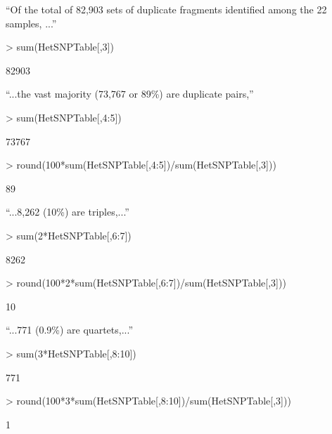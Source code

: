 \documentclass{article}
\begin{document}
``Of the total of 82,903 sets of duplicate fragments identified among the 22 samples, ...''


\begin{Schunk}
\begin{Sinput}
> sum(HetSNPTable[,3])
\end{Sinput}
\begin{Soutput}
[1] 82903
\end{Soutput}
\end{Schunk}

``...the vast majority (73,767 or 89\%) are duplicate pairs,''

\begin{Schunk}
\begin{Sinput}
> sum(HetSNPTable[,4:5])
\end{Sinput}
\begin{Soutput}
[1] 73767
\end{Soutput}
\begin{Sinput}
> round(100*sum(HetSNPTable[,4:5])/sum(HetSNPTable[,3]))
\end{Sinput}
\begin{Soutput}
[1] 89
\end{Soutput}
\end{Schunk}

``...8,262 (10\%) are triples,...''
\begin{Schunk}
\begin{Sinput}
> sum(2*HetSNPTable[,6:7])
\end{Sinput}
\begin{Soutput}
[1] 8262
\end{Soutput}
\begin{Sinput}
> round(100*2*sum(HetSNPTable[,6:7])/sum(HetSNPTable[,3]))
\end{Sinput}
\begin{Soutput}
[1] 10
\end{Soutput}
\end{Schunk}

``...771 (0.9\%) are quartets,...'' 
\begin{Schunk}
\begin{Sinput}
> sum(3*HetSNPTable[,8:10])
\end{Sinput}
\begin{Soutput}
[1] 771
\end{Soutput}
\begin{Sinput}
> round(100*3*sum(HetSNPTable[,8:10])/sum(HetSNPTable[,3]))
\end{Sinput}
\begin{Soutput}
[1] 1
\end{Soutput}
\end{Schunk}
\end{document}
